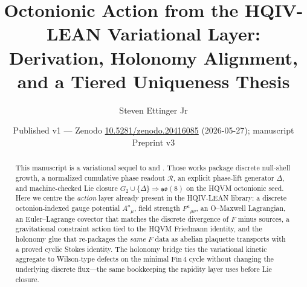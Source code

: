 \documentclass[11pt]{amsart}
\title[Octonionic Action and Uniqueness]{Octonionic Action from the HQIV-LEAN Variational Layer:\\
Derivation, Holonomy Alignment, and a Tiered Uniqueness Thesis}
\author{Steven Ettinger Jr}
\date{Published v1 --- Zenodo \href{https://doi.org/10.5281/zenodo.20416085}{10.5281/zenodo.20416085} (2026-05-27); manuscript Preprint v3}
\begin{document}
\begin{abstract}
This manuscript is a variational sequel to \cite{hqiv-so8-paper} and \cite{hqiv-3d-growth-paper}. Those works package discrete null-shell growth, a normalized cumulative phase readout \(\mathcal{R}\), an explicit phase-lift generator \(\Delta\), and machine-checked Lie closure \(G_2\cup\{\Delta\}\Rightarrow\mathfrak{so}(8)\) on the HQVM octonionic seed. Here we centre the \emph{action} layer already present in the HQIV-LEAN library: a discrete octonion-indexed gauge potential \(A^a{}_\mu\), field strength \(F^a{}_{\mu\nu}\), an O--Maxwell Lagrangian, an Euler--Lagrange covector that matches the discrete divergence of \(F\) minus sources, a gravitational constraint action tied to the HQVM Friedmann identity, and the holonomy glue that re-packages the \emph{same} \(F\) data as abelian plaquette transports with a proved cyclic Stokes identity. The holonomy bridge ties the variational kinetic aggregate to Wilson-type defects on the minimal \(\mathrm{Fin}\,4\) cycle without changing the underlying discrete flux---the same bookkeeping the rapidity layer uses before Lie closure.


\end{abstract}
\end{document}
